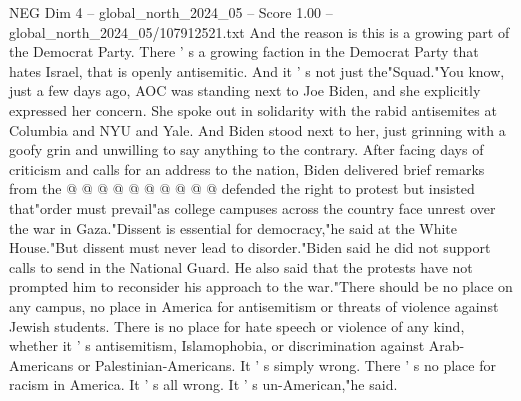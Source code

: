 \begin{textsample}{NEG Dim 4 – global\_north\_2024\_05 – Score 1.00 – global\_north\_2024\_05/107912521.txt}
And the reason is this is a growing part of the Democrat Party.
There ' s a growing faction in the Democrat Party that hates Israel, that is openly antisemitic.
And it ' s not just the"Squad."You know, just a few days ago, AOC was standing next to Joe Biden, and she explicitly expressed her concern.
She spoke out in solidarity with the rabid antisemites at Columbia and NYU and Yale.
And Biden stood next to her, just grinning with a goofy grin and unwilling to say anything to the contrary.
After facing days of criticism and calls for an address to the nation, Biden delivered brief remarks from the @ @ @ @ @ @ @ @ @ @ defended the right to protest but insisted that"order must prevail"as college campuses across the country face unrest over the war in Gaza."Dissent is essential for democracy,"he said at the White House."But dissent must never lead to disorder."Biden said he did not support calls to send in the National Guard.
He also said that the protests have not prompted him to reconsider his approach to the war."There should be no place on any campus, no place in America for antisemitism or threats of violence against Jewish students.
There is no place for hate speech or violence of any kind, whether it ' s antisemitism, Islamophobia, or discrimination against Arab-Americans or Palestinian-Americans.
It ' s simply wrong.
There ' s no place for racism in America.
It ' s all wrong.
It ' s un-American,"he said.

\end{textsample}
